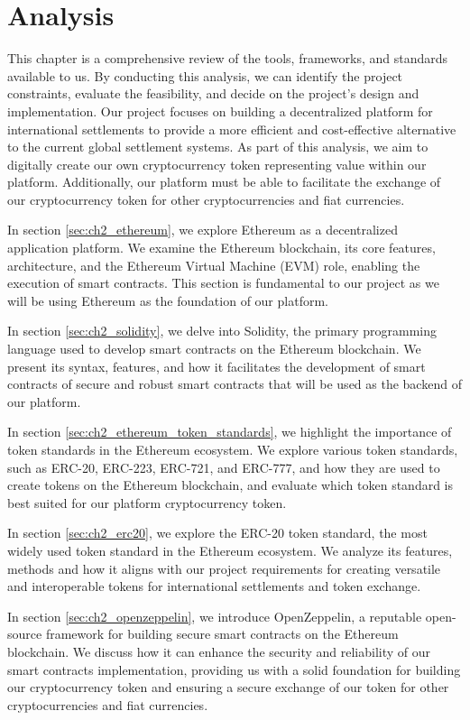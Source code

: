 \chapter{Analysis}
\label{ch:analysis}

This chapter is a comprehensive review of the tools, frameworks, and standards available to us. By conducting this analysis, we can identify the project constraints, evaluate the feasibility,
and decide on the project's design and implementation. Our project focuses on building a decentralized platform for international
settlements to provide a more efficient and cost-effective alternative to the current global settlement systems. As part of this analysis,
we aim to digitally create our own cryptocurrency token representing value within our platform. Additionally, our platform must be
able to facilitate the exchange of our cryptocurrency token for other cryptocurrencies and fiat currencies.

In section \ref{sec:ch2_ethereum}, we explore Ethereum as a decentralized application platform. We examine the Ethereum blockchain, its core features,
architecture, and the Ethereum Virtual Machine (EVM) role, enabling the execution of smart contracts. This section is fundamental to our project
as we will be using Ethereum as the foundation of our platform.

In section \ref{sec:ch2_solidity}, we delve into Solidity, the primary programming language used to develop smart contracts on the Ethereum blockchain.
We present its syntax, features, and how it facilitates the development of smart contracts of secure and robust smart contracts that will be used as the backend
of our platform.

In section \ref{sec:ch2_ethereum_token_standards}, we highlight the importance of token standards in the Ethereum ecosystem. We explore various token standards,
such as ERC-20, ERC-223, ERC-721, and ERC-777, and how they are used to create tokens on the Ethereum blockchain, and evaluate which token standard is best
suited for our platform cryptocurrency token.

In section \ref{sec:ch2_erc20}, we explore the ERC-20 token standard, the most widely used token standard in the Ethereum ecosystem. We analyze its features,
methods and how it aligns with our project requirements for creating versatile and interoperable tokens for international settlements and token exchange.

In section \ref{sec:ch2_openzeppelin}, we introduce OpenZeppelin, a reputable open-source framework for building secure smart contracts on the Ethereum blockchain.
We discuss how it can enhance the security and reliability of our smart contracts implementation, providing us with a solid foundation for building our
cryptocurrency token and ensuring a secure exchange of our token for other cryptocurrencies and fiat currencies.

